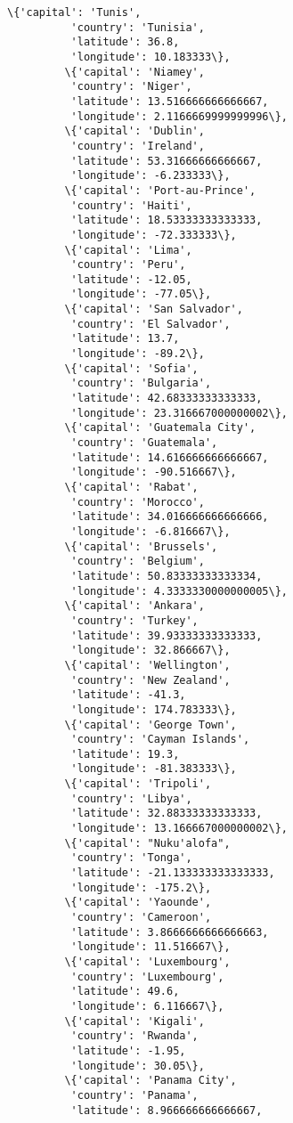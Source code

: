 \documentclass[11pt]{article}
\begin{document}
\begin{Verbatim}[commandchars=\\\{\}]
         \{'capital': 'Tunis',
          'country': 'Tunisia',
          'latitude': 36.8,
          'longitude': 10.183333\},
         \{'capital': 'Niamey',
          'country': 'Niger',
          'latitude': 13.516666666666667,
          'longitude': 2.1166669999999996\},
         \{'capital': 'Dublin',
          'country': 'Ireland',
          'latitude': 53.31666666666667,
          'longitude': -6.233333\},
         \{'capital': 'Port-au-Prince',
          'country': 'Haiti',
          'latitude': 18.53333333333333,
          'longitude': -72.333333\},
         \{'capital': 'Lima',
          'country': 'Peru',
          'latitude': -12.05,
          'longitude': -77.05\},
         \{'capital': 'San Salvador',
          'country': 'El Salvador',
          'latitude': 13.7,
          'longitude': -89.2\},
         \{'capital': 'Sofia',
          'country': 'Bulgaria',
          'latitude': 42.68333333333333,
          'longitude': 23.316667000000002\},
         \{'capital': 'Guatemala City',
          'country': 'Guatemala',
          'latitude': 14.616666666666667,
          'longitude': -90.516667\},
         \{'capital': 'Rabat',
          'country': 'Morocco',
          'latitude': 34.016666666666666,
          'longitude': -6.816667\},
         \{'capital': 'Brussels',
          'country': 'Belgium',
          'latitude': 50.83333333333334,
          'longitude': 4.3333330000000005\},
         \{'capital': 'Ankara',
          'country': 'Turkey',
          'latitude': 39.93333333333333,
          'longitude': 32.866667\},
         \{'capital': 'Wellington',
          'country': 'New Zealand',
          'latitude': -41.3,
          'longitude': 174.783333\},
         \{'capital': 'George Town',
          'country': 'Cayman Islands',
          'latitude': 19.3,
          'longitude': -81.383333\},
         \{'capital': 'Tripoli',
          'country': 'Libya',
          'latitude': 32.88333333333333,
          'longitude': 13.166667000000002\},
         \{'capital': "Nuku'alofa",
          'country': 'Tonga',
          'latitude': -21.133333333333333,
          'longitude': -175.2\},
         \{'capital': 'Yaounde',
          'country': 'Cameroon',
          'latitude': 3.8666666666666663,
          'longitude': 11.516667\},
         \{'capital': 'Luxembourg',
          'country': 'Luxembourg',
          'latitude': 49.6,
          'longitude': 6.116667\},
         \{'capital': 'Kigali',
          'country': 'Rwanda',
          'latitude': -1.95,
          'longitude': 30.05\},
         \{'capital': 'Panama City',
          'country': 'Panama',
          'latitude': 8.966666666666667,

\end{Verbatim}
\end{document}
